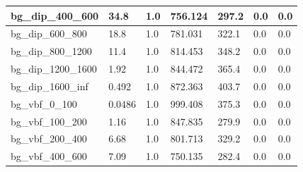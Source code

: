 \documentclass[a4paper, 10pt]{article}
\begin{document}
\begin{table}[H]
\begin{center}
\begin{tabular}{|m{23.0mm}|m{23.0mm}|m{18.0mm}|m{19.0mm}|m{19.0mm}|m{19.0mm}|m{19.0mm}|}
      \hline
      {\cellcolor{white}         bg\_dip\_400\_600}& {\cellcolor{white}         34.8}& {\cellcolor{white}         1.0}& {\cellcolor{white}         756.124}& {\cellcolor{white}         297.2}& {\cellcolor{green}         0.0}& {\cellcolor{green}         0.0}\\
      \hline
      {\cellcolor{white}         bg\_dip\_600\_800}& {\cellcolor{white}         18.8}& {\cellcolor{white}         1.0}& {\cellcolor{white}         781.031}& {\cellcolor{white}         322.1}& {\cellcolor{green}         0.0}& {\cellcolor{green}         0.0}\\
      \hline
      {\cellcolor{white}         bg\_dip\_800\_1200}& {\cellcolor{white}         11.4}& {\cellcolor{white}         1.0}& {\cellcolor{white}         814.453}& {\cellcolor{white}         348.2}& {\cellcolor{green}         0.0}& {\cellcolor{green}         0.0}\\
      \hline
      {\cellcolor{white}         bg\_dip\_1200\_1600}& {\cellcolor{white}         1.92}& {\cellcolor{white}         1.0}& {\cellcolor{white}         844.472}& {\cellcolor{white}         365.4}& {\cellcolor{green}         0.0}& {\cellcolor{green}         0.0}\\
      \hline
      {\cellcolor{white}         bg\_dip\_1600\_inf}& {\cellcolor{white}         0.492}& {\cellcolor{white}         1.0}& {\cellcolor{white}         872.363}& {\cellcolor{white}         403.7}& {\cellcolor{green}         0.0}& {\cellcolor{green}         0.0}\\
      \hline
      {\cellcolor{white}         bg\_vbf\_0\_100}& {\cellcolor{white}         0.0486}& {\cellcolor{white}         1.0}& {\cellcolor{white}         999.408}& {\cellcolor{white}         375.3}& {\cellcolor{green}         0.0}& {\cellcolor{green}         0.0}\\
      \hline
      {\cellcolor{white}         bg\_vbf\_100\_200}& {\cellcolor{white}         1.16}& {\cellcolor{white}         1.0}& {\cellcolor{white}         847.835}& {\cellcolor{white}         279.9}& {\cellcolor{green}         0.0}& {\cellcolor{green}         0.0}\\
      \hline
      {\cellcolor{white}         bg\_vbf\_200\_400}& {\cellcolor{white}         6.68}& {\cellcolor{white}         1.0}& {\cellcolor{white}         801.713}& {\cellcolor{white}         329.2}& {\cellcolor{green}         0.0}& {\cellcolor{green}         0.0}\\
      \hline
      {\cellcolor{white}         bg\_vbf\_400\_600}& {\cellcolor{white}         7.09}& {\cellcolor{white}         1.0}& {\cellcolor{white}         750.135}& {\cellcolor{white}         282.4}& {\cellcolor{green}         0.0}& {\cellcolor{green}         0.0}\\

\end{tabular}
\end{center}
\end{table}
\end{document}
